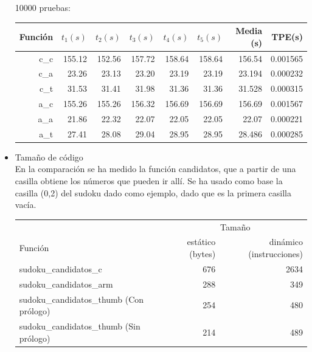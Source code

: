\documentclass[12pt,letterpaper]{article}
\begin{document}
\begin{itemize}
  10000 pruebas:\\
  \begin{center}
    \begin{tabular}{ r | r | r | r | r | r | r | r }
      Función & $t_1 (s)$ & $t_2 (s)$ & $t_3 (s)$ & $t_4 (s)$ & $t_5 (s)$ & Media (s) & TPE\footnotemark[1] (s) \\ \hline
      c\_c    & 155.12 & 152.56 & 157.72 & 158.64 & 158.64 & 156.54 & 0.001565 \\
      c\_a    & 23.26  & 23.13  & 23.20  & 23.19  & 23.19  & 23.194 & 0.000232 \\
      c\_t    & 31.53  & 31.41  & 31.98  & 31.36  & 31.36  & 31.528 & 0.000315 \\ \hline
      a\_c    & 155.26 & 155.26 & 156.32 & 156.69 & 156.69 & 156.69 & 0.001567 \\
      a\_a    & 21.86  & 22.32  & 22.07  & 22.05  & 22.05  & 22.07  & 0.000221 \\
      a\_t    & 27.41  & 28.08  & 29.04  & 28.95  & 28.95  & 28.486 & 0.000285 \\ \hline
    \end{tabular}
  \end{center}
  \clearpage
\item {\large Tamaño de código}\\
  En la comparación se ha medido la función candidatos, que a partir
  de una casilla obtiene los números que pueden ir allí. Se ha usado
  como base la casilla (0,2) del sudoku dado como ejemplo, dado que es
  la primera casilla vacía.
  \begin{center}
    \begin{tabular}{ l | r | r }
      & \multicolumn{2}{|c}{Tamaño} \\
      Función                                 & estático (bytes)   & dinámico (instrucciones) \\ \hline
      sudoku\_candidatos\_c                   & 676                  & 2634                       \\
      sudoku\_candidatos\_arm                 & 288                  & 349                        \\
      sudoku\_candidatos\_thumb (Con prólogo) & 254                  & 480                        \\
      sudoku\_candidatos\_thumb (Sin prólogo) & 214                  & 489                        \\ \hline

\end{tabular}
\end{center}
\end{itemize}
\end{document}
